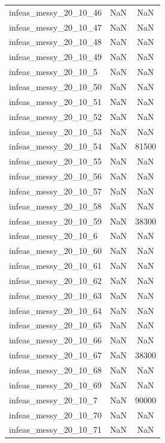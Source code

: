 \begin{longtable}{lcc}
infeas\_messy\_20\_10\_46  &      NaN &    NaN \\
infeas\_messy\_20\_10\_47  &      NaN &    NaN \\
infeas\_messy\_20\_10\_48  &      NaN &    NaN \\
infeas\_messy\_20\_10\_49  &      NaN &    NaN \\
infeas\_messy\_20\_10\_5   &      NaN &    NaN \\
infeas\_messy\_20\_10\_50  &      NaN &    NaN \\
infeas\_messy\_20\_10\_51  &      NaN &    NaN \\
infeas\_messy\_20\_10\_52  &      NaN &    NaN \\
infeas\_messy\_20\_10\_53  &      NaN &    NaN \\
infeas\_messy\_20\_10\_54  &      NaN &  81500 \\
infeas\_messy\_20\_10\_55  &      NaN &    NaN \\
infeas\_messy\_20\_10\_56  &      NaN &    NaN \\
infeas\_messy\_20\_10\_57  &      NaN &    NaN \\
infeas\_messy\_20\_10\_58  &      NaN &    NaN \\
infeas\_messy\_20\_10\_59  &      NaN &  38300 \\
infeas\_messy\_20\_10\_6   &      NaN &    NaN \\
infeas\_messy\_20\_10\_60  &      NaN &    NaN \\
infeas\_messy\_20\_10\_61  &      NaN &    NaN \\
infeas\_messy\_20\_10\_62  &      NaN &    NaN \\
infeas\_messy\_20\_10\_63  &      NaN &    NaN \\
infeas\_messy\_20\_10\_64  &      NaN &    NaN \\
infeas\_messy\_20\_10\_65  &      NaN &    NaN \\
infeas\_messy\_20\_10\_66  &      NaN &    NaN \\
infeas\_messy\_20\_10\_67  &      NaN &  38300 \\
infeas\_messy\_20\_10\_68  &      NaN &    NaN \\
infeas\_messy\_20\_10\_69  &      NaN &    NaN \\
infeas\_messy\_20\_10\_7   &      NaN &  90000 \\
infeas\_messy\_20\_10\_70  &      NaN &    NaN \\
infeas\_messy\_20\_10\_71  &      NaN &    NaN \\

\end{longtable}
